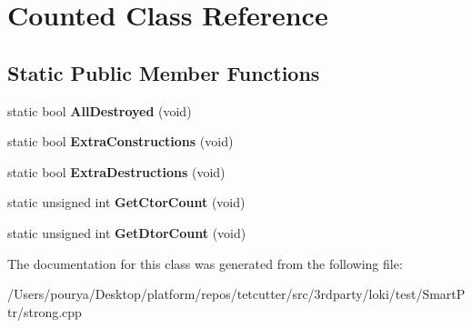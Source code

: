 \hypertarget{classCounted}{}\section{Counted Class Reference}
\label{classCounted}
\subsection*{Static Public Member Functions}
\begin{DoxyCompactItemize}
\item 
\hypertarget{classCounted_aa30966655c690936c821112d08ae125a}{}static bool {\bfseries All\+Destroyed} (void)\label{classCounted_aa30966655c690936c821112d08ae125a}

\item 
\hypertarget{classCounted_af2165b4ca3a4462b6aa40facb35287dd}{}static bool {\bfseries Extra\+Constructions} (void)\label{classCounted_af2165b4ca3a4462b6aa40facb35287dd}

\item 
\hypertarget{classCounted_a572adabafa3013e65fc25a985fd86826}{}static bool {\bfseries Extra\+Destructions} (void)\label{classCounted_a572adabafa3013e65fc25a985fd86826}

\item 
\hypertarget{classCounted_a1bb808e876c2561073aece4a56c3363e}{}static unsigned int {\bfseries Get\+Ctor\+Count} (void)\label{classCounted_a1bb808e876c2561073aece4a56c3363e}

\item 
\hypertarget{classCounted_ac270a033315b792d197e20a3696e0a4f}{}static unsigned int {\bfseries Get\+Dtor\+Count} (void)\label{classCounted_ac270a033315b792d197e20a3696e0a4f}

\end{DoxyCompactItemize}


The documentation for this class was generated from the following file\+:\begin{DoxyCompactItemize}
\item 
/\+Users/pourya/\+Desktop/platform/repos/tetcutter/src/3rdparty/loki/test/\+Smart\+Ptr/strong.\+cpp\end{DoxyCompactItemize}

